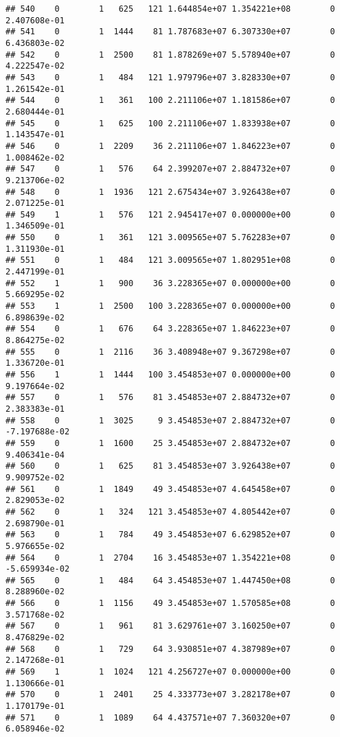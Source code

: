\documentclass[
]{article}
\begin{document}
\begin{enumerate}
\begin{verbatim}
## 540    0        1   625   121 1.644854e+07 1.354221e+08        0  2.407608e-01
## 541    0        1  1444    81 1.787683e+07 6.307330e+07        0  6.436803e-02
## 542    0        1  2500    81 1.878269e+07 5.578940e+07        0  4.222547e-02
## 543    0        1   484   121 1.979796e+07 3.828330e+07        0  1.261542e-01
## 544    0        1   361   100 2.211106e+07 1.181586e+07        0  2.680444e-01
## 545    0        1   625   100 2.211106e+07 1.833938e+07        0  1.143547e-01
## 546    0        1  2209    36 2.211106e+07 1.846223e+07        0  1.008462e-02
## 547    0        1   576    64 2.399207e+07 2.884732e+07        0  9.213706e-02
## 548    0        1  1936   121 2.675434e+07 3.926438e+07        0  2.071225e-01
## 549    1        1   576   121 2.945417e+07 0.000000e+00        0  1.346509e-01
## 550    0        1   361   121 3.009565e+07 5.762283e+07        0  1.311930e-01
## 551    0        1   484   121 3.009565e+07 1.802951e+08        0  2.447199e-01
## 552    1        1   900    36 3.228365e+07 0.000000e+00        0  5.669295e-02
## 553    1        1  2500   100 3.228365e+07 0.000000e+00        0  6.898639e-02
## 554    0        1   676    64 3.228365e+07 1.846223e+07        0  8.864275e-02
## 555    0        1  2116    36 3.408948e+07 9.367298e+07        0  1.336720e-01
## 556    1        1  1444   100 3.454853e+07 0.000000e+00        0  9.197664e-02
## 557    0        1   576    81 3.454853e+07 2.884732e+07        0  2.383383e-01
## 558    0        1  3025     9 3.454853e+07 2.884732e+07        0 -7.197688e-02
## 559    0        1  1600    25 3.454853e+07 2.884732e+07        0  9.406341e-04
## 560    0        1   625    81 3.454853e+07 3.926438e+07        0  9.909752e-02
## 561    0        1  1849    49 3.454853e+07 4.645458e+07        0  2.829053e-02
## 562    0        1   324   121 3.454853e+07 4.805442e+07        0  2.698790e-01
## 563    0        1   784    49 3.454853e+07 6.629852e+07        0  5.976655e-02
## 564    0        1  2704    16 3.454853e+07 1.354221e+08        0 -5.659934e-02
## 565    0        1   484    64 3.454853e+07 1.447450e+08        0  8.288960e-02
## 566    0        1  1156    49 3.454853e+07 1.570585e+08        0  3.571768e-02
## 567    0        1   961    81 3.629761e+07 3.160250e+07        0  8.476829e-02
## 568    0        1   729    64 3.930851e+07 4.387989e+07        0  2.147268e-01
## 569    1        1  1024   121 4.256727e+07 0.000000e+00        0  1.130666e-01
## 570    0        1  2401    25 4.333773e+07 3.282178e+07        0  1.170179e-01
## 571    0        1  1089    64 4.437571e+07 7.360320e+07        0  6.058946e-02

\end{verbatim}
\end{enumerate}
\end{document}
